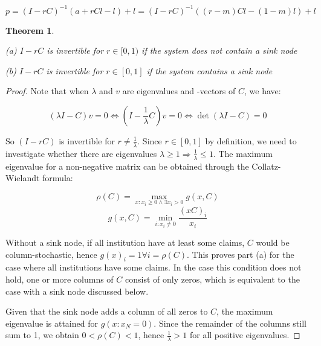 \documentclass[authoryear,12pt]{elsarticle}
\newtheorem{theorem}{Theorem}
\begin{document}
\begin{equation} \label{eqn_Solution}
p = (I - rC)^{-1} (a + rCl - l) + l = (I - rC)^{-1} ((r-m)Cl-(1-m)l) + l
\end{equation}

\begin{theorem} \label{thm_Invertibility} \leavevmode

(a) $I - rC$ is invertible for $r \in [0,1)$ if the system does not contain a sink node

(b) $I - rC$ is invertible for $r \in [0,1]$ if the system contains a sink node
\end{theorem}

\begin{proof} \leavevmode

Note that when $\lambda$ and $v$ are eigenvalues and -vectors of $C$, we have:

\begin{equation}
(\lambda I-C)v=0 \Leftrightarrow (I-\frac{1}{\lambda} C)v=0 \Leftrightarrow \det (\lambda I-C)=0
\end{equation}

So $(I - rC)$ is invertible for $r \ne \frac{1}{\lambda}$. Since $r \in [0,1]$ by definition, we need to investigate whether there are eigenvalues $\lambda \ge 1 \Rightarrow \frac{1}{\lambda} \le 1$. The maximum eigenvalue for a non-negative matrix can be obtained through the Collatz-Wielandt formula:

\begin{equation}
\rho (C) = \max_{x : x_i \ge 0 \land \exists x_i >0 } g(x,C) 
\end{equation}
\begin{equation}
g(x,C) = \min_{i : x_i \ne 0} \frac{(xC)_i}{x_i}
\end{equation}

Without a sink node, if all institution have at least some claims, $C$ would be column-stochastic, hence $g(x)_i = 1 \forall i = \rho(C)$. This proves part (a) for the case where all institutions have some claims. In the case this condition does not hold, one or more columns of $C$ consist of only zeros, which is equivalent to the case with a sink node discussed below.

Given that the sink node adds a column of all zeros to $C$, the maximum eigenvalue is attained for $g(x : x_N = 0)$.  Since the remainder of the columns still sum to 1, we obtain $0 < \rho (C) < 1$, hence $\frac{1}{\lambda} > 1$ for all positive eigenvalues. 
\end{proof}
\end{document}
